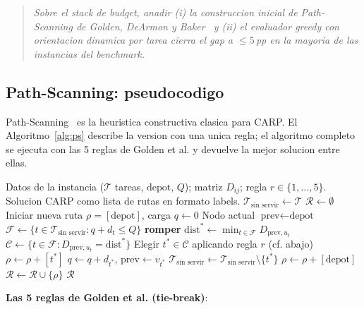 \begin{quote}
\textit{Sobre el stack de budget, anadir (i) la construccion inicial
de Path-Scanning de Golden, DeArmon y Baker~\cite{golden1983} y (ii) el evaluador
greedy con orientacion dinamica por tarea cierra el gap a $\le 5$\,pp
en la mayoria de las instancias del benchmark.}
\end{quote}

\subsection{Path-Scanning: pseudocodigo}

Path-Scanning~\cite{golden1983} es la heuristica constructiva clasica para CARP. El
Algoritmo~\ref{alg:ps} describe la version con una unica regla; el
algoritmo completo se ejecuta con las 5 reglas de Golden et al. y
devuelve la mejor solucion entre ellas.

\begin{algorithm}[h]
\caption{Path-Scanning con regla $r$.}
\label{alg:ps}
\begin{algorithmic}[1]
\Require Datos de la instancia ($\mathcal{T}$ tareas, $\text{depot}$, $Q$);
  matriz $D_{ij}$; regla $r \in \{1, \dots, 5\}$.
\Ensure Solucion CARP como lista de rutas en formato labels.
\State $\mathcal{T}_{\text{sin servir}} \gets \mathcal{T}$
\State $\mathcal{R} \gets \emptyset$
  \State Iniciar nueva ruta $\rho = [\text{depot}]$, carga $q \gets 0$
  \State Nodo actual $\text{prev} \gets \text{depot}$
    \State $\mathcal{F} \gets \{ t \in \mathcal{T}_{\text{sin servir}} : q + d_t \le Q \}$
     \textbf{romper} \EndIf
    \State $\mathrm{dist}^* \gets \min_{t \in \mathcal{F}} D_{\text{prev}, u_t}$
    \State $\mathcal{C} \gets \{ t \in \mathcal{F} : D_{\text{prev}, u_t} = \mathrm{dist}^* \}$
    \State Elegir $t^* \in \mathcal{C}$ aplicando regla $r$ (cf. abajo)
    \State $\rho \gets \rho + [t^*]$
    \State $q \gets q + d_{t^*}$, $\text{prev} \gets v_{t^*}$
    \State $\mathcal{T}_{\text{sin servir}} \gets \mathcal{T}_{\text{sin servir}} \setminus \{t^*\}$
  \EndWhile
  \State $\rho \gets \rho + [\text{depot}]$
  \State $\mathcal{R} \gets \mathcal{R} \cup \{\rho\}$
\EndWhile
\State \Return $\mathcal{R}$
\end{algorithmic}
\end{algorithm}

\textbf{Las 5 reglas de Golden et al. (tie-break)}:

